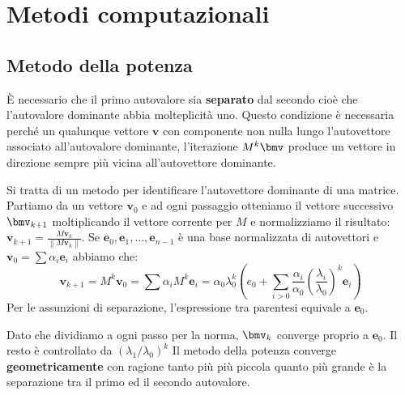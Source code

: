 \documentclass[\main/main.tex]{subfiles}
\begin{document}
\chapter{Metodi computazionali}
\section{Metodo della potenza}
\begin{multicols}{2}
\begin{observation}
    È necessario che il primo autovalore sia \textbf{separato} dal secondo cioè che l'autovalore dominante abbia molteplicità uno. Questo condizione è necessaria perché un qualunque vettore \(\bm{v}\) con componente non nulla lungo l'autovettore associato all'autovalore dominante, l'iterazione \(M^k\bmv\) produce un vettore in direzione sempre più vicina all'autovettore dominante.
\end{observation}
\begin{definition}
    Si tratta di un metodo per identificare l'autovettore dominante di una matrice. Partiamo da un vettore \(\bm{v}_0\) e ad ogni passaggio otteniamo il vettore successivo \(\bmv_{k+1}\) moltiplicando il vettore corrente per \(M\) e normalizziamo il risultato: \(
        \boldsymbol{v}_{k+1}=\frac{M \boldsymbol{v}_{k}}{\left\|M \boldsymbol{v}_{k}\right\|}
    \). Se \(\bm{e}_0, \bm{e}_1, \ldots, \bm{e}_{n-1}\) è una base normalizzata di autovettori e \(\boldsymbol{v}_{0}=\sum \alpha_{i} \boldsymbol{e}_{i}\) abbiamo che:
    \[
        \boldsymbol{v}_{k+1}=M^{k} \boldsymbol{v}_{0}=\sum \alpha_{i} M^{k} \boldsymbol{e}_{i}=\alpha_{0} \lambda_{0}^{k}\left(e_{0}+\sum_{i>0} \frac{\alpha_{i}}{\alpha_{0}}\left(\frac{\lambda_{i}}{\lambda_{0}}\right)^{k} \boldsymbol{e}_{i}\right)
    \]
    Per le assunzioni di separazione, l'espressione tra parentesi equivale a \(\bm{e}_0\).
\end{definition}
\begin{observation}
    Dato che dividiamo a ogni passo per la norma, \(\bmv_k\) converge proprio a \(\bm{e}_0\). Il resto è controllato da \(
        \left(\lambda_{1} / \lambda_{0}\right)^{k}
    \)
    Il metodo della potenza converge \textbf{geometricamente} con ragione tanto più più piccola quanto più grande è la separazione tra il primo ed il secondo autovalore.
\end{observation}
\begin{observation}

\end{observation}
\end{multicols}
\end{document}
